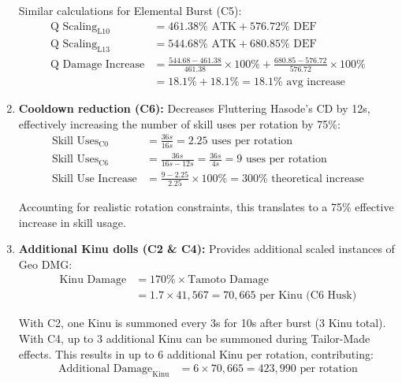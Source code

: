 \documentclass[12pt,a4paper]{article}
\begin{document}
\begin{enumerate}
        Similar calculations for Elemental Burst (C5):
        \begin{align}
        \text{Q Scaling}_{\text{L10}} &= 461.38\% \text{ ATK} + 576.72\% \text{ DEF} \\
        \text{Q Scaling}_{\text{L13}} &= 544.68\% \text{ ATK} + 680.85\% \text{ DEF} \\
        \text{Q Damage Increase} &= \frac{544.68 - 461.38}{461.38} \times 100\% + \frac{680.85 - 576.72}{576.72} \times 100\% \\
        &= 18.1\% + 18.1\% = 18.1\% \text{ avg increase}
        \end{align}
    
    \item \textbf{Cooldown reduction (C6):} Decreases Fluttering Hasode's CD by 12s, effectively increasing the number of skill uses per rotation by 75\%:
        \begin{align}
        \text{Skill Uses}_{\text{C0}} &= \frac{36s}{16s} = 2.25 \text{ uses per rotation} \\
        \text{Skill Uses}_{\text{C6}} &= \frac{36s}{16s-12s} = \frac{36s}{4s} = 9 \text{ uses per rotation} \\
        \text{Skill Use Increase} &= \frac{9 - 2.25}{2.25} \times 100\% = 300\% \text{ theoretical increase}
        \end{align}
        
        Accounting for realistic rotation constraints, this translates to a 75\% effective increase in skill usage.
    
    \item \textbf{Additional Kinu dolls (C2 \& C4):} Provides additional scaled instances of Geo DMG:
        \begin{align}
        \text{Kinu Damage} &= 170\% \times \text{Tamoto Damage} \\
        &= 1.7 \times 41,567 = 70,665 \text{ per Kinu (C6 Husk)}
        \end{align}
        
        With C2, one Kinu is summoned every 3s for 10s after burst (3 Kinu total). With C4, up to 3 additional Kinu can be summoned during Tailor-Made effects. This results in up to 6 additional Kinu per rotation, contributing:
        \begin{align}
        \text{Additional Damage}_{\text{Kinu}} &= 6 \times 70,665 = 423,990 \text{ per rotation}
        \end{align}
\end{enumerate}
\end{document}
